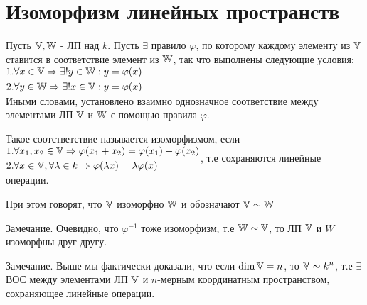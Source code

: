 \documentclass[../main.tex]{subfiles}
\begin{document}
\section{Изоморфизм линейных пространств}
Пусть $\mathbb{V}, \mathbb{W} $ - ЛП над $k$. Пусть $\exists $ правило $\varphi$, по которому каждому элементу из $\mathbb{V}$ ставится в соответствие элемент из $\mathbb{W}$, так что выполнены следующие условия:
$\begin{aligned}
    &1. \forall x \in \mathbb{V} \Rightarrow \exists ! y \in \mathbb{W}: y = \varphi(x)\\
    &2. \forall y \in \mathbb{W} \Rightarrow \exists ! x \in \mathbb{V}: y = \varphi(x)
\end{aligned}$
\\Иными словами, установлено взаимно однозначное соответствие между элементами ЛП $\mathbb{V}$ и $\mathbb{W}$ с помощью правила $\varphi$.
\begin{definition}
    Такое соотстветствие называется изоморфизмом, если 
    $\begin{aligned}
        &1. \forall x_{1},x_{2} \in \mathbb{V} \Rightarrow \varphi(x_{1}+x_{2}) = \varphi(x_{1})+\varphi(x_{2})\\ 
        &2. \forall x\in \mathbb{V}, \forall \lambda \in k \Rightarrow \varphi(\lambda x) = \lambda \varphi(x)
    \end{aligned}$, т.е сохраняются линейные операции.
\end{definition}
При этом говорят, что $\mathbb{V}$ изоморфно $\mathbb{W}$ и обозначают $\mathbb{V} \sim \mathbb{W}$

Замечание. Очевидно, что $\varphi^{-1}$ тоже изоморфизм, т.е $\mathbb{W} \sim \mathbb{V}$, то ЛП $\mathbb{V}$ и $W$ изоморфны друг другу.

Замечание. Выше мы фактически доказали, что если $\dim \mathbb{V} = n $, то $\mathbb{V} \sim k^{n}$, т.е $\exists $ ВОС между элементами ЛП $\mathbb{V}$ и $n$-мерным координатным пространством, сохраняющее линейные операции. 
\end{document}

